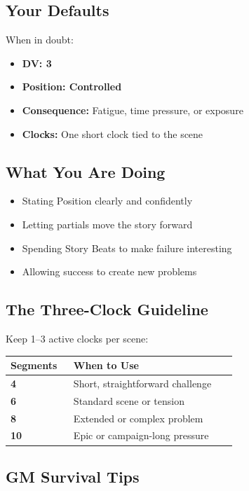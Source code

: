 \documentclass[10pt]{article}
\begin{document}
\subsection{Your Defaults}
When in doubt:
\begin{itemize}[leftmargin=*]
    \item \textbf{DV: 3}
    \item \textbf{Position: Controlled}
    \item \textbf{Consequence:} Fatigue, time pressure, or exposure
    \item \textbf{Clocks:} One short clock tied to the scene
\end{itemize}

\subsection{What You Are Doing}
\begin{itemize}[leftmargin=*]
    \item Stating Position clearly and confidently
    \item Letting partials move the story forward
    \item Spending Story Beats to make failure interesting
    \item Allowing success to create new problems
\end{itemize}

\subsection{The Three-Clock Guideline}
Keep 1–3 active clocks per scene:
\begin{coretable}
\begin{tabular}{>{\bfseries}p{0.25\linewidth} p{0.65\linewidth}}
\toprule
\textbf{Segments} & \textbf{When to Use} \\
\midrule
4 & Short, straightforward challenge \\
6 & Standard scene or tension \\
8 & Extended or complex problem \\
10 & Epic or campaign-long pressure \\
\bottomrule
\end{tabular}
\end{coretable}

\subsection{GM Survival Tips}
\end{document}

